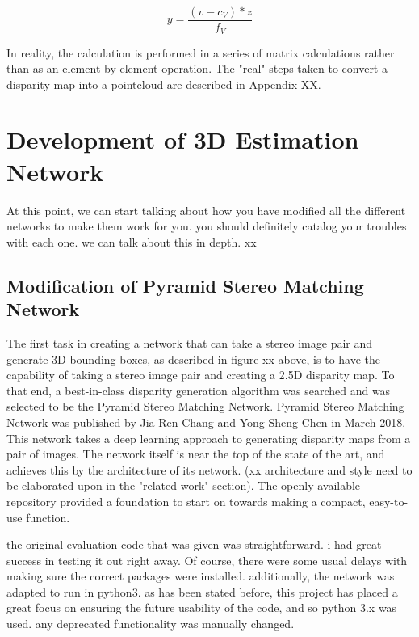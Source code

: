 \begin{equation}
y = \frac{(v - c_V) * z}{f_V}
\end{equation}

In reality, the calculation is performed in a series of matrix calculations rather than as an element-by-element operation. The "real" steps taken to convert a disparity map into a pointcloud are described in Appendix XX.


\section{Development of 3D Estimation Network}
At this point, we can start talking about how you have modified all the different networks to make them work for you. you should definitely catalog your troubles with each one. we can talk about this in depth. xx

\subsection{Modification of Pyramid Stereo Matching Network}
The first task in creating a network that can take a stereo image pair and generate 3D bounding boxes, as described in figure xx above, is to have the capability of taking a stereo image pair and creating a 2.5D disparity map. To that end, a best-in-class disparity generation algorithm was searched and was selected to be the Pyramid Stereo Matching Network. Pyramid Stereo Matching Network was published by Jia-Ren Chang and Yong-Sheng Chen in March 2018. This network takes a deep learning approach to generating disparity maps from a pair of images. The network itself is near the top of the state of the art, and achieves this by the architecture of its network. (xx architecture and style need to be elaborated upon in the "related work" section). The openly-available repository provided a foundation to start on towards making a compact, easy-to-use function. 

the original evaluation code that was given was straightforward. i had great success in testing it out right away. Of course, there were some usual delays with making sure the correct packages were installed. additionally, the network was adapted to run in python3. as has been stated before, this project has placed a great focus on ensuring the future usability of the code, and so python 3.x was used. any deprecated functionality was manually changed. 

